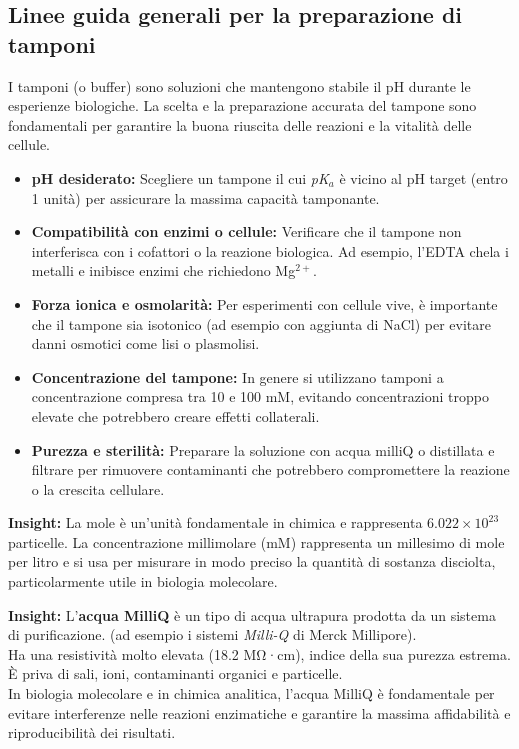 \subsection{Linee guida generali per la preparazione di tamponi}

I tamponi (o buffer) sono soluzioni che mantengono stabile il pH durante le esperienze biologiche. La scelta e la preparazione accurata del tampone sono fondamentali per garantire la buona riuscita delle reazioni e la vitalità delle cellule.

\begin{itemize}\footnotesize
    \item \textbf{pH desiderato:} Scegliere un tampone il cui \textit{pK}$_a$ è vicino al pH target (entro 1 unità) per assicurare la massima capacità tamponante.
    \item \textbf{Compatibilità con enzimi o cellule:} Verificare che il tampone non interferisca con i cofattori o la reazione biologica. Ad esempio, l’EDTA chela i metalli e inibisce enzimi che richiedono Mg$^{2+}$.
    \item \textbf{Forza ionica e osmolarità:} Per esperimenti con cellule vive, è importante che il tampone sia isotonico (ad esempio con aggiunta di NaCl) per evitare danni osmotici come lisi o plasmolisi.
    \item \textbf{Concentrazione del tampone:} In genere si utilizzano tamponi a concentrazione compresa tra 10 e 100 mM, evitando concentrazioni troppo elevate che potrebbero creare effetti collaterali.
    \item \textbf{Purezza e sterilità:} Preparare la soluzione con acqua milliQ o distillata e filtrare per rimuovere contaminanti che potrebbero compromettere la reazione o la crescita cellulare.
\end{itemize}

\begin{insightBox}
  \textbf{Insight:} La mole è un’unità fondamentale in chimica e rappresenta $6.022 \times 10^{23}$ particelle. La concentrazione millimolare (mM) rappresenta un millesimo di mole per litro e si usa per misurare in modo preciso la quantità di sostanza disciolta, particolarmente utile in biologia molecolare.
\end{insightBox}

\begin{insightBox}
  \textbf{Insight:} L’\textbf{acqua MilliQ} è un tipo di acqua ultrapura prodotta da un sistema di purificazione. (ad esempio i sistemi \textit{Milli-Q} di Merck Millipore).\\
  Ha una resistività molto elevata (18.2 MΩ·cm), indice della sua purezza estrema. È priva di sali, ioni, contaminanti organici e particelle.\\
  In biologia molecolare e in chimica analitica, l’acqua MilliQ è fondamentale per evitare interferenze nelle reazioni enzimatiche e garantire la massima affidabilità e riproducibilità dei risultati.
\end{insightBox}